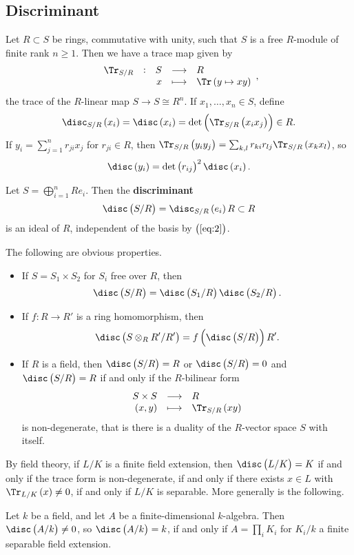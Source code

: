 \subsection{Discriminant}

Let $ R \subset S $ be rings, commutative with unity, such that $ S $ is a free $ R $-module of finite rank $ n \ge 1 $. Then we have a trace map given by
$$ \function[\Tr_{S / R}]{S}{R}{x}{\Tr\br{y \mapsto xy}}, $$
the trace of the $ R $-linear map $ S \to S \cong R^n $. If $ x_1, \dots, x_n \in S $, define
$$ \disc_{S / R} \br{x_i} = \disc \br{x_i} = \det \br{\Tr_{S / R}\br{x_ix_j}} \in R. $$
If $ y_i = \sum_{j = 1}^n r_{ji}x_j $ for $ r_{ji} \in R $, then $ \Tr_{S / R}\br{y_iy_j} = \sum_{k, l} r_{ki}r_{lj}\Tr_{S / R}\br{x_kx_l} $, so
\begin{equation}
\label{eq:2}
\disc \br{y_i} = \det \br{r_{ij}}^2 \disc \br{x_i}.
\end{equation}

\begin{definition*}
Let $ S = \bigoplus_{i = 1}^n Re_i $. Then the \textbf{discriminant}
$$ \disc\br{S / R} = \disc_{S / R} \br{e_i}R \subset R $$
is an ideal of $ R $, independent of the basis by $ \br{\ref{eq:2}} $.
\end{definition*}

The following are obvious properties.
\begin{itemize}
\item If $ S = S_1 \times S_2 $ for $ S_i $ free over $ R $, then
$$ \disc\br{S / R} = \disc\br{S_1 / R}\disc\br{S_2 / R}. $$
\item If $ f : R \to R' $ is a ring homomorphism, then
$$ \disc\br{S \otimes_R R' / R'} = f\br{\disc\br{S / R}}R'. $$
\item If $ R $ is a field, then $ \disc\br{S / R} = R $ or $ \disc\br{S / R} = 0 $ and $ \disc\br{S / R} = R $ if and only if the $ R $-bilinear form
$$ \function{S \times S}{R}{\br{x, y}}{\Tr_{S / R}\br{xy}} $$
is non-degenerate, that is there is a duality of the $ R $-vector space $ S $ with itself.
\end{itemize}
By field theory, if $ L / K $ is a finite field extension, then $ \disc\br{L / K} = K $ if and only if the trace form is non-degenerate, if and only if there exists $ x \in L $ with $ \Tr_{L / K}\br{x} \ne 0 $, if and only if $ L / K $ is separable. More generally is the following.

\begin{theorem}
\label{thm:3.1}
Let $ k $ be a field, and let $ A $ be a finite-dimensional $ k $-algebra. Then $ \disc\br{A / k} \ne 0 $, so $ \disc\br{A / k} = k $, if and only if $ A = \prod_i K_i $ for $ K_i / k $ a finite separable field extension.
\end{theorem}

